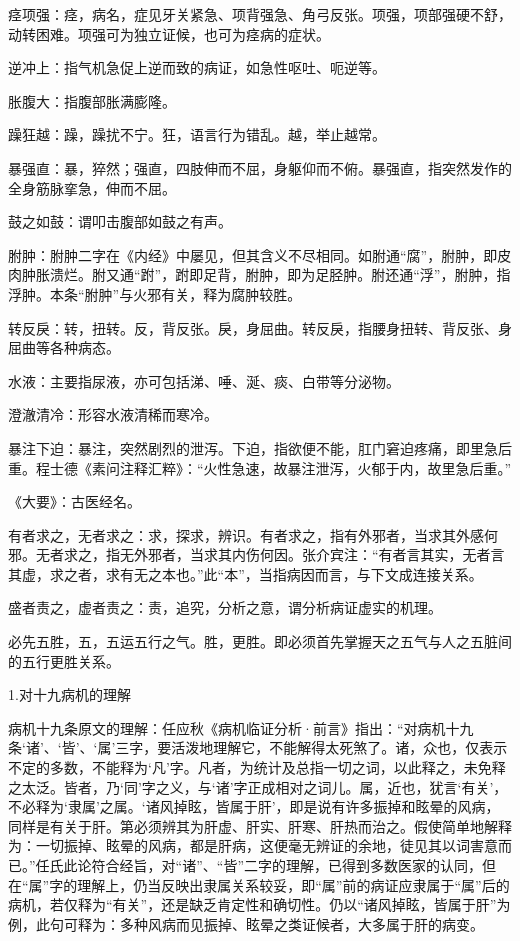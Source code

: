 \documentclass[draft,12pt]{ctexbook}
\begin{document}
\begin{jiaozhu}
  \item 痉项强：痉，病名，症见牙关紧急、项背强急、角弓反张。项强，项部强硬不舒，动转困难。项强可为独立证候，也可为痉病的症状。
  \item 逆冲上：指气机急促上逆而致的病证，如急性呕吐、呃逆等。
  \item 胀腹大：指腹部胀满膨隆。
  \item 躁狂越：躁，躁扰不宁。狂，语言行为错乱。越，举止越常。
  \item 暴强直：暴，猝然；强直，四肢伸而不屈，身躯仰而不俯。暴强直，指突然发作的全身筋脉挛急，伸而不屈。
  \item 鼓之如鼓：谓叩击腹部如鼓之有声。
  \item 胕肿：胕肿二字在《内经》中屡见，但其含义不尽相同。如胕通“腐”，胕肿，即皮肉肿胀溃烂。胕又通“跗”，跗即足背，胕肿，即为足胫肿。胕还通“浮”，胕肿，指浮肿。本条“胕肿”与火邪有关，释为腐肿较胜。
  \item 转反戾：转，扭转。反，背反张。戾，身屈曲。转反戾，指腰身扭转、背反张、身屈曲等各种病态。
  \item 水液：主要指尿液，亦可包括涕、唾、涎、痰、白带等分泌物。
  \item 澄澈清冷：形容水液清稀而寒冷。
  \item 暴注下迫：暴注，突然剧烈的泄泻。下迫，指欲便不能，肛门窘迫疼痛，即里急后重。程士德《素问注释汇粹》：“火性急速，故暴注泄泻，火郁于内，故里急后重。”
  \item 《大要》：古医经名。
  \item 有者求之，无者求之：求，探求，辨识。有者求之，指有外邪者，当求其外感何邪。无者求之，指无外邪者，当求其内伤何因。张介宾注：“有者言其实，无者言其虚，求之者，求有无之本也。”此“本”，当指病因而言，与下文成连接关系。
  \item 盛者责之，虚者责之：责，追究，分析之意，谓分析病证虚实的机理。
  \item 必先五胜，五，五运五行之气。胜，更胜。即必须首先掌握天之五气与人之五脏间的五行更胜关系。
\end{jiaozhu}


1.对十九病机的理解

病机十九条原文的理解：任应秋《病机临证分析·前言》指出：“对病机十九条‘诸’、‘皆’、‘属’三字，要活泼地理解它，不能解得太死煞了。诸，众也，仅表示不定的多数，不能释为‘凡’字。凡者，为统计及总指一切之词，以此释之，未免释之太泛。皆者，乃‘同’字之义，与‘诸’字正成相对之词儿。属，近也，犹言‘有关’，不必释为‘隶属’之属。‘诸风掉眩，皆属于肝’，即是说有许多振掉和眩晕的风病，同样是有关于肝。第必须辨其为肝虚、肝实、肝寒、肝热而治之。假使简单地解释为：一切振掉、眩晕的风病，都是肝病，这便毫无辨证的余地，徒见其以词害意而已。”任氏此论符合经旨，对“诸”、“皆”二字的理解，已得到多数医家的认同，但在“属”字的理解上，仍当反映出隶属关系较妥，即“属”前的病证应隶属于“属”后的病机，若仅释为“有关”，还是缺乏肯定性和确切性。仍以“诸风掉眩，皆属于肝”为例，此句可释为：多种风病而见振掉、眩晕之类证候者，大多属于肝的病变。
\end{document}
